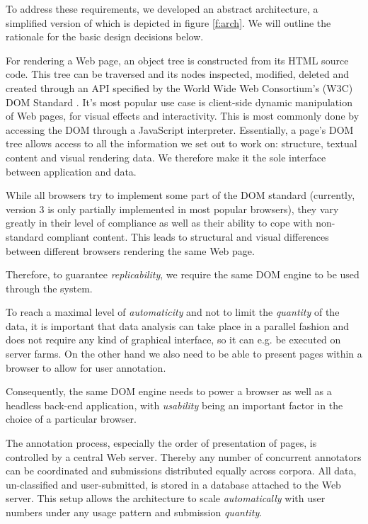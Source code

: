 To address these requirements, we developed an abstract architecture, a simplified version of which is depicted in figure \ref{f:arch}.
We will outline the rationale for the basic design decisions below.


For rendering a Web page, an object tree is constructed from its HTML source code.
This tree can be traversed and its nodes inspected, modified, deleted and created through an API specified by the World Wide Web Consortium's (W3C) DOM Standard \cite{dom}.
It's most popular use case is client-side dynamic manipulation of Web pages, for visual effects and interactivity.
This is most commonly done by accessing the DOM through a JavaScript interpreter.
Essentially, a page's DOM tree allows access to all the information we set out to work on: structure, textual content and visual rendering data.
We therefore make it the sole interface between application and data.

While all browsers try to implement some part of the DOM standard (currently, version 3 is only partially implemented in most popular browsers), they vary greatly in their level of compliance as well as their ability to cope with non-standard compliant content.
This leads to structural and visual differences between different browsers rendering the same Web page.

Therefore, to guarantee \textit{replicability}, we require the same DOM engine to be used through the system.


To reach a maximal level of \textit{automaticity} and not to limit the \textit{quantity} of the data, it is important that data analysis can take place in a parallel fashion and does not require any kind of graphical interface, so it can e.g. be executed on server farms.
On the other hand we also need to be able to present pages within a browser to allow for user annotation.

Consequently, the same DOM engine needs to power a browser as well as a headless back-end application, with \textit{usability} being an important factor in the choice of a particular browser.


The annotation process, especially the order of presentation of pages, is controlled by a central Web server.
Thereby any number of concurrent annotators can be coordinated and submissions distributed equally across corpora.
All data, un-classified and user-submitted, is stored in a database attached to the Web server.
This setup allows the architecture to scale \textit{automatically} with user numbers under any usage pattern and submission \textit{quantity}.


